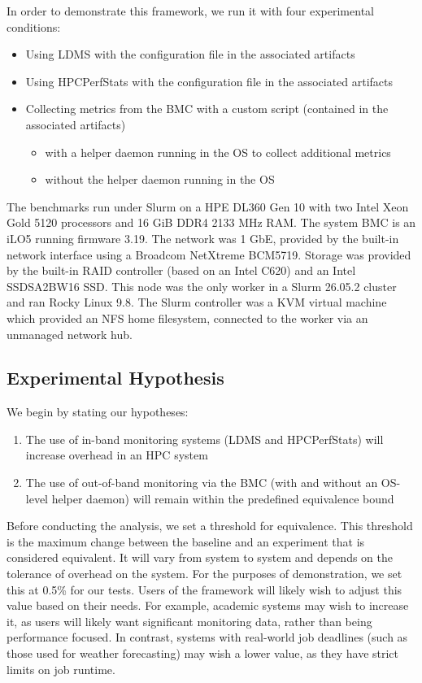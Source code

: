 \documentclass[conference]{IEEEtran}
\begin{document}
In order to demonstrate this framework, we run it with four experimental 
conditions:
\begin{itemize}
    \item Using LDMS with the configuration file in the associated artifacts\cite{HPCNexusLabImpactofMonitoringonHPCWorkloads}
    \item Using HPCPerfStats with the configuration file in the associated artifacts\cite{HPCNexusLabImpactofMonitoringonHPCWorkloads}
    \item Collecting metrics from the BMC with a custom script 
    (contained in the associated artifacts\cite{HPCNexusLabImpactofMonitoringonHPCWorkloads})
    \begin{itemize}
        \item with a helper daemon running in the OS to collect additional metrics
        \item without the helper daemon running in the OS
    \end{itemize}
\end{itemize}
The benchmarks run under Slurm on a HPE DL360 Gen 10 with two Intel Xeon Gold 
5120 processors and 16 GiB DDR4 2133 MHz RAM. The system BMC is an iLO5 running firmware 3.19.
The network was 1 GbE, provided by the built-in network interface using 
a Broadcom NetXtreme BCM5719. Storage was provided by the built-in RAID 
controller (based on an Intel C620) and an Intel SSDSA2BW16 SSD. This node was 
the only worker in a Slurm 26.05.2 cluster and ran Rocky Linux 9.8. The Slurm 
controller was a KVM virtual machine which provided an NFS home 
filesystem, connected to the worker via an unmanaged network hub.

\subsection{Experimental Hypothesis}

We begin by stating our hypotheses:
\begin{enumerate}
    \item The use of in-band monitoring systems (LDMS and HPCPerfStats) will increase overhead in an HPC 
    system
    \item The use of out-of-band monitoring via the BMC (with and without an OS-level helper daemon) will remain within the predefined equivalence bound
\end{enumerate}
Before conducting the analysis, we set a threshold for equivalence. This threshold is the maximum 
change between the baseline and an experiment that is considered equivalent. It
will vary from system to system and depends on the tolerance of overhead on the system.
For the purposes of demonstration, we set this at 0.5\% for our tests.
Users of the framework will likely wish to adjust this value based on their
needs. For example, academic systems may wish to increase it, as users will likely want 
significant monitoring data, rather than being performance focused. In contrast, 
systems with real-world job deadlines (such as those used for weather forecasting) may wish a lower value, as they have 
strict limits on job runtime.
\end{document}
